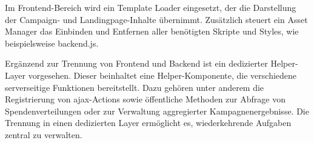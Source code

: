 Im Frontend-Bereich wird ein Template Loader eingesetzt, der die Darstellung der Campaign- und Landingpage-Inhalte übernimmt.
Zusätzlich steuert ein Asset Manager das Einbinden und Entfernen aller benötigten Skripte und Styles, wie beispielsweise backend.js.

Ergänzend zur Trennung von Frontend und Backend ist ein dedizierter Helper-Layer vorgesehen.
Dieser beinhaltet eine Helper-Komponente, die verschiedene serverseitige Funktionen bereitstellt.
Dazu gehören unter anderem die Registrierung von \gls{ajax}-Actions sowie öffentliche Methoden zur Abfrage von Spendenverteilungen oder zur Verwaltung aggregierter Kampagnenergebnisse.
Die Trennung in einen dedizierten Layer ermöglicht es, wiederkehrende Aufgaben zentral zu verwalten.


%
